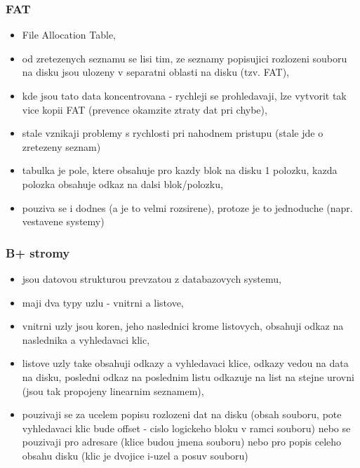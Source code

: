 \documentclass[a4paper, 11pt]{article}
\begin{document}
\subsubsection{FAT}
\begin{itemize}
    \item File Allocation Table,
    \item od zretezenych seznamu se lisi tim, ze seznamy popisujici rozlozeni souboru na disku jsou ulozeny v separatni oblasti na disku (tzv. FAT),
    \item kde jsou tato data koncentrovana - rychleji se prohledavaji, lze vytvorit tak vice kopii FAT (prevence okamzite ztraty dat pri chybe),
    \item stale vznikaji problemy s rychlosti pri nahodnem pristupu (stale jde o zretezeny seznam)
    \item tabulka je pole, ktere obsahuje pro kazdy blok na disku 1 polozku, kazda polozka obsahuje odkaz na dalsi blok/polozku,
    \item pouziva se i dodnes (a je to velmi rozsirene), protoze je to jednoduche (napr. vestavene systemy) \\
\end{itemize}

\newpage

\subsubsection{B+ stromy}
\begin{itemize}
    \item jsou datovou strukturou prevzatou z databazovych systemu,
    \item maji dva typy uzlu - vnitrni a listove,
    \item vnitrni uzly jsou koren, jeho naslednici krome listovych, obsahuji odkaz na naslednika a vyhledavaci klic,
    \item listove uzly take obsahuji odkazy a vyhledavaci klice, odkazy vedou na data na disku, posledni odkaz na poslednim listu odkazuje na list na stejne urovni (jsou tak propojeny linearnim seznamem),
    \item pouzivaji se za ucelem popisu rozlozeni dat na disku (obsah souboru, pote vyhledavaci klic bude offset - cislo logickeho bloku v ramci souboru) nebo se pouzivaji pro adresare (klice budou jmena souboru) nebo pro popis celeho obsahu disku (klic je dvojice i-uzel a posuv souboru) \\
\end{itemize}
\end{document}
